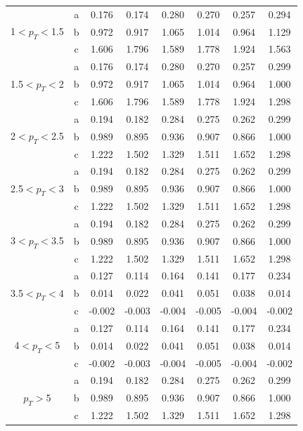 \begin{small}
\begin{center}
\begin{longtable}{c|c|c|c|c|c|c|c}
\multirow{3}{*}{1$< p_T <$1.5}& a  &0.176 &0.174 &0.280 &0.270 &0.257 &0.294\\
& b  &0.972 &0.917 &1.065 &1.014 &0.964 &1.129\\
& c  &1.606 &1.796 &1.589 &1.778 &1.924 &1.563\\ \hline
\multirow{3}{*}{1.5$< p_T <$2}& a  &0.176 &0.174 &0.280 &0.270 &0.257 &0.299\\
& b  &0.972 &0.917 &1.065 &1.014 &0.964 &1.000\\
& c  &1.606 &1.796 &1.589 &1.778 &1.924 &1.298\\ \hline
\multirow{3}{*}{2$< p_T <$2.5}& a  &0.194 &0.182 &0.284 &0.275 &0.262 &0.299\\
& b  &0.989 &0.895 &0.936 &0.907 &0.866 &1.000\\
& c  &1.222 &1.502 &1.329 &1.511 &1.652 &1.298\\ \hline
\multirow{3}{*}{2.5$< p_T <$3}& a  &0.194 &0.182 &0.284 &0.275 &0.262 &0.299\\
& b  &0.989 &0.895 &0.936 &0.907 &0.866 &1.000\\
& c  &1.222 &1.502 &1.329 &1.511 &1.652 &1.298\\ \hline
\multirow{3}{*}{3$< p_T <$3.5}& a  &0.194 &0.182 &0.284 &0.275 &0.262 &0.299\\
& b  &0.989 &0.895 &0.936 &0.907 &0.866 &1.000\\
& c  &1.222 &1.502 &1.329 &1.511 &1.652 &1.298\\ \hline
\multirow{3}{*}{3.5$< p_T <$4}& a  &0.127 &0.114 &0.164 &0.141 &0.177 &0.234\\
& b  &0.014 &0.022 &0.041 &0.051 &0.038 &0.014\\
& c  &-0.002 &-0.003 &-0.004 &-0.005 &-0.004 &-0.002\\ \hline
\multirow{3}{*}{4$< p_T <$5}& a  &0.127 &0.114 &0.164 &0.141 &0.177 &0.234\\
& b  &0.014 &0.022 &0.041 &0.051 &0.038 &0.014\\
& c  &-0.002 &-0.003 &-0.004 &-0.005 &-0.004 &-0.002\\ \hline
\multirow{3}{*}{$p_T >$5}& a  &0.194 &0.182 &0.284 &0.275 &0.262 &0.299\\
& b  &0.989 &0.895 &0.936 &0.907 &0.866 &1.000\\
& c  &1.222 &1.502 &1.329 &1.511 &1.652 &1.298\\ \hline

\end{longtable}
\end{center}
\end{small}